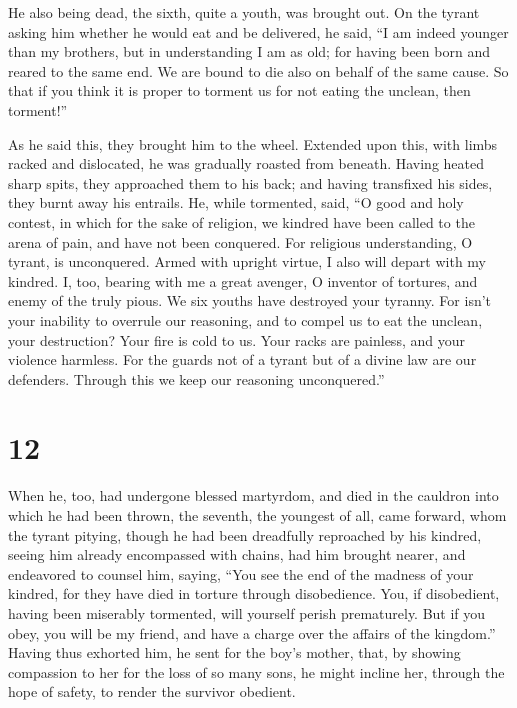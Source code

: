  He also being dead, the sixth, quite a youth, was brought
out. On the tyrant asking him whether he would eat and be delivered, he
said,  ``I am indeed younger than my brothers, but in
understanding I am as old;  for having been born and reared
to the same end. We are bound to die also on behalf of the same cause.
 So that if you think it is proper to torment us for not
eating the unclean, then torment!''

 As he said this, they brought him to the wheel.
 Extended upon this, with limbs racked and dislocated, he
was gradually roasted from beneath.  Having heated sharp
spits, they approached them to his back; and having transfixed his
sides, they burnt away his entrails.  He, while tormented,
said, ``O good and holy contest, in which for the sake of religion, we
kindred have been called to the arena of pain, and have not been
conquered.  For religious understanding, O tyrant, is
unconquered.  Armed with upright virtue, I also will depart
with my kindred.  I, too, bearing with me a great avenger,
O inventor of tortures, and enemy of the truly pious.  We
six youths have destroyed your tyranny.  For isn't your
inability to overrule our reasoning, and to compel us to eat the
unclean, your destruction?  Your fire is cold to us. Your
racks are painless, and your violence harmless.  For the
guards not of a tyrant but of a divine law are our defenders. Through
this we keep our reasoning unconquered.''

\hypertarget{section-11}{%
\section{12}\label{section-11}}

 When he, too, had undergone blessed martyrdom, and died in
the cauldron into which he had been thrown, the seventh, the youngest of
all, came forward,  whom the tyrant pitying, though he had
been dreadfully reproached by his kindred,  seeing him
already encompassed with chains, had him brought nearer, and endeavored
to counsel him, saying,  ``You see the end of the madness of
your kindred, for they have died in torture through disobedience. You,
if disobedient, having been miserably tormented, will yourself perish
prematurely.  But if you obey, you will be my friend, and
have a charge over the affairs of the kingdom.''  Having
thus exhorted him, he sent for the boy's mother, that, by showing
compassion to her for the loss of so many sons, he might incline her,
through the hope of safety, to render the survivor obedient.

